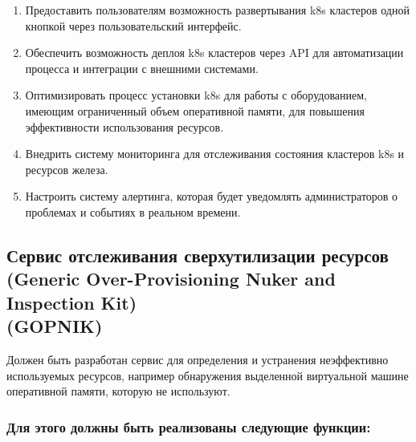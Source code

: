 \documentclass[14pt, a4paper]{extarticle}
\begin{document}
\begin{enumerate}
\item Предоставить пользователям возможность развертывания k8s кластеров одной кнопкой через пользовательский интерфейс.
\item Обеспечить возможность деплоя k8s кластеров через API для автоматизации процесса и интеграции с внешними системами.
\item Оптимизировать процесс установки k8s для работы с оборудованием, имеющим ограниченный объем оперативной памяти, для повышения эффективности использования ресурсов.
\item Внедрить систему мониторинга для отслеживания состояния кластеров k8s и ресурсов железа.
\item Настроить систему алертинга, которая будет уведомлять администраторов о проблемах и событиях в реальном времени.
\end{enumerate}

\subsection{Сервис отслеживания сверхутилизации ресурсов\\ (Generic Over-Provisioning Nuker and Inspection Kit)\\ (GOPNIK)}

Должен быть разработан сервис для определения и устранения неэффективно используемых ресурсов, например обнаружения выделенной виртуальной машине оперативной памяти, которую не используют.

\subsubsection*{Для этого должны быть реализованы следующие функции:}
\end{document}
